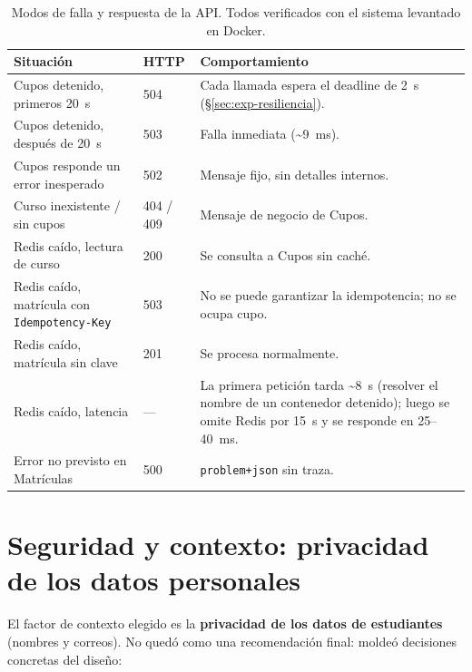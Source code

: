 \documentclass[11pt,spanish]{article}
\begin{document}
\begin{table}[H]
\centering
\small
\begin{tabularx}{\textwidth}{p{5.2cm} p{1.3cm} X}
\toprule
\textbf{Situación} & \textbf{HTTP} & \textbf{Comportamiento} \\
\midrule
Cupos detenido, primeros 20~s & 504 & Cada llamada espera el deadline de 2~s (\S\ref{sec:exp-resiliencia}). \\
Cupos detenido, después de 20~s & 503 & Falla inmediata (\textasciitilde 9~ms). \\
Cupos responde un error inesperado & 502 & Mensaje fijo, sin detalles internos. \\
Curso inexistente / sin cupos & 404 / 409 & Mensaje de negocio de Cupos. \\
Redis caído, lectura de curso & 200 & Se consulta a Cupos sin caché. \\
Redis caído, matrícula con \texttt{Idempotency-Key} & 503 & No se puede garantizar la idempotencia; no se ocupa cupo. \\
Redis caído, matrícula sin clave & 201 & Se procesa normalmente. \\
Redis caído, latencia & — & La primera petición tarda \textasciitilde 8~s (resolver el nombre de un contenedor detenido); luego se omite Redis por 15~s y se responde en 25--40~ms. \\
Error no previsto en Matrículas & 500 & \texttt{problem+json} sin traza. \\
\bottomrule
\end{tabularx}
\caption{Modos de falla y respuesta de la API. Todos verificados con el sistema levantado en Docker.}
\end{table}

\section{Seguridad y contexto: privacidad de los datos personales}

El factor de contexto elegido es la \textbf{privacidad de los datos de estudiantes} (nombres y correos). No quedó como una recomendación final: moldeó decisiones concretas del diseño:
\end{document}
